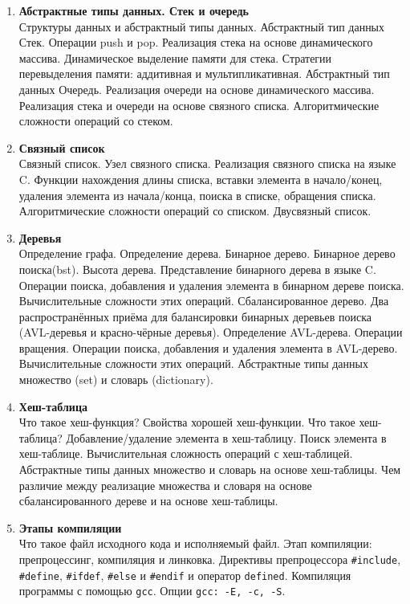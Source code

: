 \documentclass{article}
\begin{document}
\begin{enumerate}
\item  \textbf{Абстрактные типы данных. Стек и очередь}\\
Структуры данных и абстрактный типы данных. Абстрактный тип данных Стек. Операции push и pop. Реализация стека на основе динамического массива. Динамическое выделение памяти для стека. Стратегии перевыделения памяти: аддитивная и мультипликативная. Абстрактный тип данных Очередь. Реализация очереди на основе динамического массива. Реализация стека и очереди на основе связного списка. Алгоритмические сложности операций со стеком.

\item \textbf{Связный список}\\
Связный список. Узел связного списка. Реализация связного списка на языке C. Функции нахождения длины списка, вставки элемента в начало/конец, удаления элемента из начала/конца, поиска в списке, обращения списка. Алгоритмические сложности операций со списком. Двусвязный список.


\item \textbf{Деревья}\\
Определение графа. Определение дерева. Бинарное дерево. Бинарное дерево поиска(bst). Высота дерева. Представление бинарного дерева в языке C. Операции поиска, добавления и удаления элемента в бинарном дереве поиска. Вычислительные сложности этих операций. Сбалансированное дерево. Два распространённых приёма для балансировки бинарных деревьев поиска (AVL-деревья и красно-чёрные деревья). Определение AVL-дерева. Операции вращения. Операции поиска, добавления и удаления элемента в AVL-дерево. Вычислительные сложности этих операций. Абстрактные типы данных множество (set) и словарь (dictionary).


\item \textbf{Хеш-таблица}\\
Что такое хеш-функция? Свойства хорошей хеш-функции. Что такое хеш-таблица? Добавление/удаление элемента в хеш-таблицу. Поиск элемента в хеш-таблице. Вычислительная сложность операций с хеш-таблицей. Абстрактные типы данных множество и словарь на основе хеш-таблицы. Чем различие между реализацие множества и словаря на основе сбалансированного дереве и на основе хеш-таблицы.




\item \textbf{Этапы компиляции}\\
Что такое файл исходного кода и исполняемый файл. Этап компиляции: препроцессинг, компиляция и линковка. Директивы препроцессора \texttt{\#include}, \texttt{\#define}, \texttt{\#ifdef}, \texttt{\#else} и \texttt{\#endif} и оператор \texttt{defined}. Компиляция программы с помощью \texttt{gcc}. Опции \texttt{gcc: -E, -c, -S}.



\end{enumerate}
\end{document}
